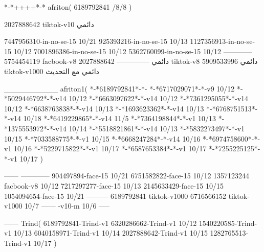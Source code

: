 *-*++++*-*
afriton(
6189792841 /8/8
)

2027888642 tiktok-v10
دائمي


7447956310-in-no-se-15 10/21
925393216-in-no-se-15 10/13
1127356913-in-no-se-15 10/12
7001896386-in-no-se-15 10/12
5362760099-in-no-se-15 10/12
------------
5754454119 facbook-v8
دائمي
--------------
2027888642 tiktok-v8
دائمي
5909533996 tiktok-v1000
دائمي مع التحديث

__________
afriton1(
*-*6189792841*-*-
*-*6717029071*-*-v9 10/12
*-*5029446792*-*-v14 10/12
*-*6663097622*-*-v14 10/12
*-*7361295055*-*-v14 10/12
*-*6638763838*-*-v14 10/13
*-*1693623362*-*-v14 10/13
*-*6768751513*-*-v14 10/18
*-*6419229865*-*-v14 11/5
*-*7364198844*-*-v1 10/13
*-*1375553972*-*-v14 10/14
*-*5518821861*-*-v14 10/13
*-*5832273497*-*-v1 10/15
*-*7033588775*-*-v1 10/15
*-*6668247284*-*-v14 10/16
*-*6974758600*-*-v1 10/16
*-*5229715822*-*-v1 10/17
*-*6587653384*-*-v1 10/17
*-*7255225125*-*-v1 10/17
)

------
------------
904497894-face-15 10/21
6751582822-face-15 10/12
1357123244 facbook-v8 10/12
7217297277-face-15 10/13
2145633429-face-15 10/15
1054094654-face-15 10/21
---------
6189792841 tiktok-v1000
6716566152 tiktok-v1000
10/7
------
-v10-m 10/6
-----

------
Trind(
6189792841-Trind-v1 
6320286662-Trind-v1 10/12
1540220585-Trind-v1 10/13
6040158971-Trind-v1 10/14
2027888642-Trind-v1 10/15
1282765513-Trind-v1 10/17
)
